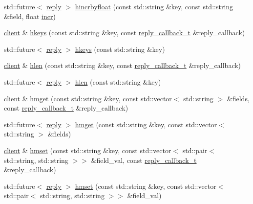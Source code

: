 \begin{DoxyCompactItemize}
\item 
std\+::future$<$ \hyperlink{classcpp__redis_1_1reply}{reply} $>$ \hyperlink{classcpp__redis_1_1client_a6b856272a5956b3b2839c5b5749c9b97}{hincrbyfloat} (const std\+::string \&key, const std\+::string \&field, float \hyperlink{classcpp__redis_1_1client_a2f9ba6c7e83451207403096b19da4faa}{incr})
\item 
\hyperlink{classcpp__redis_1_1client}{client} \& \hyperlink{classcpp__redis_1_1client_a432f322ff1818fa65208725b1be7f4d2}{hkeys} (const std\+::string \&key, const \hyperlink{classcpp__redis_1_1client_a061a1140d36d2eaeda82b09a0bb3f9f2}{reply\+\_\+callback\+\_\+t} \&reply\+\_\+callback)
\item 
std\+::future$<$ \hyperlink{classcpp__redis_1_1reply}{reply} $>$ \hyperlink{classcpp__redis_1_1client_a578dade240f8fbbd6ba797bff9be18dd}{hkeys} (const std\+::string \&key)
\item 
\hyperlink{classcpp__redis_1_1client}{client} \& \hyperlink{classcpp__redis_1_1client_a88b88d74f77f2a59bc75b7d1fcdbd483}{hlen} (const std\+::string \&key, const \hyperlink{classcpp__redis_1_1client_a061a1140d36d2eaeda82b09a0bb3f9f2}{reply\+\_\+callback\+\_\+t} \&reply\+\_\+callback)
\item 
std\+::future$<$ \hyperlink{classcpp__redis_1_1reply}{reply} $>$ \hyperlink{classcpp__redis_1_1client_a34b5783e7392f29dd26c6e114d535221}{hlen} (const std\+::string \&key)
\item 
\hyperlink{classcpp__redis_1_1client}{client} \& \hyperlink{classcpp__redis_1_1client_aac28715b6b151dd96ddb760fcc490c3c}{hmget} (const std\+::string \&key, const std\+::vector$<$ std\+::string $>$ \&fields, const \hyperlink{classcpp__redis_1_1client_a061a1140d36d2eaeda82b09a0bb3f9f2}{reply\+\_\+callback\+\_\+t} \&reply\+\_\+callback)
\item 
std\+::future$<$ \hyperlink{classcpp__redis_1_1reply}{reply} $>$ \hyperlink{classcpp__redis_1_1client_a8e3af68988204e491ada35efaaf9b247}{hmget} (const std\+::string \&key, const std\+::vector$<$ std\+::string $>$ \&fields)
\item 
\hyperlink{classcpp__redis_1_1client}{client} \& \hyperlink{classcpp__redis_1_1client_a8c5f96c6e663d89aa18baba495872cfb}{hmset} (const std\+::string \&key, const std\+::vector$<$ std\+::pair$<$ std\+::string, std\+::string $>$$>$ \&field\+\_\+val, const \hyperlink{classcpp__redis_1_1client_a061a1140d36d2eaeda82b09a0bb3f9f2}{reply\+\_\+callback\+\_\+t} \&reply\+\_\+callback)
\item 
std\+::future$<$ \hyperlink{classcpp__redis_1_1reply}{reply} $>$ \hyperlink{classcpp__redis_1_1client_acbb8d8fa40a64a155e19e49aae12f117}{hmset} (const std\+::string \&key, const std\+::vector$<$ std\+::pair$<$ std\+::string, std\+::string $>$$>$ \&field\+\_\+val)

\end{DoxyCompactItemize}
